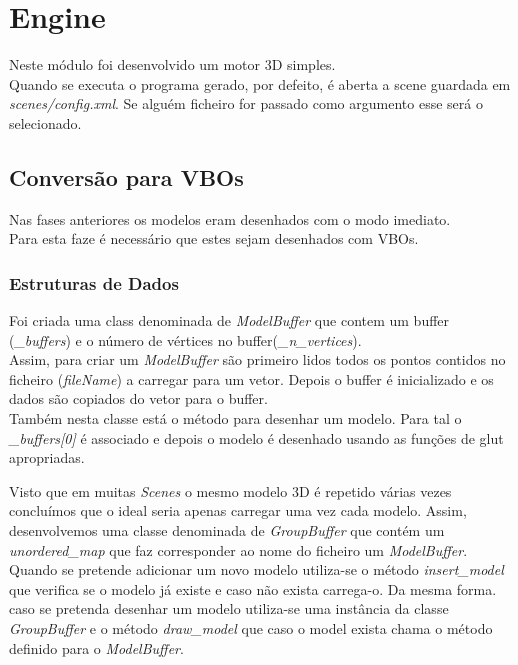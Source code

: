 \documentclass[a4paper]{report}
\begin{document}
\chapter{Engine}
Neste módulo foi desenvolvido um motor 3D simples.\\
Quando se executa o programa gerado, por defeito, é aberta a scene guardada em
\textit{scenes/config.xml}. Se alguém ficheiro for passado como argumento esse
será o selecionado.\\

\section{Conversão para VBOs}
Nas fases anteriores os modelos eram desenhados com o modo imediato.\\
Para esta faze é necessário que estes sejam desenhados com VBOs.

\subsection{Estruturas de Dados}
Foi criada uma class denominada de \textit{ModelBuffer} que contem um buffer
(\textit{\_buffers}) e o número de vértices no buffer(\textit{\_n\_vertices}).\\
Assim, para criar um \textit{ModelBuffer} são primeiro lidos todos os pontos
contidos no ficheiro (\textit{fileName}) a carregar para um vetor. Depois o
buffer é inicializado e os dados são copiados do vetor para o buffer.\\


Também nesta classe está o método para desenhar um modelo. Para tal o
\textit{\_buffers[0]} é associado e depois o modelo é desenhado usando as
funções de glut apropriadas.


Visto que em muitas \textit{Scenes} o mesmo modelo 3D é repetido várias vezes
concluímos que o ideal seria apenas carregar uma vez cada modelo. Assim,
desenvolvemos uma classe denominada de \textit{GroupBuffer} que contém um
\textit{unordered\_map} que faz corresponder ao nome do ficheiro um
\textit{ModelBuffer}.\\
Quando se pretende adicionar um novo modelo utiliza-se o método
\textit{insert\_model} que verifica se o modelo já existe e caso não exista
carrega-o. Da mesma forma. caso se pretenda desenhar um modelo utiliza-se uma
instância da classe \textit{GroupBuffer} e o método \textit{draw\_model} que
caso o model exista chama o método definido para o \textit{ModelBuffer}.
\end{document}
